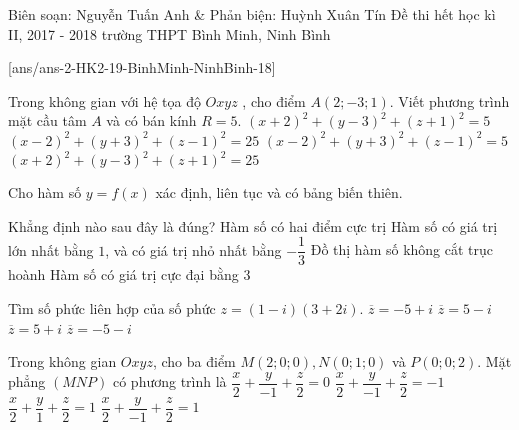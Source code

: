 
\begin{name}
{Biên soạn: Nguyễn Tuấn Anh \& Phản biện: Huỳnh Xuân Tín}
{Đề thi hết học kì II, 2017 - 2018 trường THPT Bình Minh, Ninh Bình}
\end{name}
\setcounter{ex}{0}\setcounter{bt}{0}
[ans/ans-2-HK2-19-BinhMinh-NinhBinh-18]
\begin{ex}%
Trong không gian với hệ tọa độ $Oxyz$ , cho điểm $A(2;-3;1)$. Viết phương trình mặt cầu tâm
$A$ và có bán kính $R=5$.
\choice
{$(x+2)^2+(y-3)^2+(z+1)^2=5$}
{\True $(x-2)^2+(y+3)^2+(z-1)^2=25$}
{$(x-2)^2+(y+3)^2+(z-1)^2=5$}
{$(x+2)^2+(y-3)^2+(z+1)^2=25$}
\end{ex}
\begin{ex}%
Cho hàm số $y=f(x)$ xác định, liên tục và có bảng biến thiên.
\begin{center}
\end{center}
Khẳng định nào sau đây là đúng?
\choice
{\True Hàm số có hai điểm cực trị}
{Hàm số có giá trị lớn nhất bằng $1$, và có giá trị nhỏ nhất bằng $-\dfrac{1}{3}$}
{Đồ thị hàm số không cắt trục hoành}
{Hàm số có giá trị cực đại bằng $3$}
\end{ex}
\begin{ex}%
Tìm số phức liên hợp của số phức $z=(1-i)(3+2i)$.
\choice
{$\overline{z}=-5+i$}
{$\overline{z}=5-i$}
{\True $\overline{z}=5+i$}
{$\overline{z}=-5-i$}
\end{ex}
\begin{ex}%
Trong không gian $Oxyz$, cho ba điểm $M(2;0;0), N(0;1;0)$ và $P(0;0;2)$. Mặt phẳng $(MNP)$ có phương trình là
\choice
{$\dfrac{x}{2}+\dfrac{y}{-1}+\dfrac{z}{2}=0$}
{$\dfrac{x}{2}+\dfrac{y}{-1}+\dfrac{z}{2}=-1$}
{\True $\dfrac{x}{2}+\dfrac{y}{1}+\dfrac{z}{2}=1$}
{$\dfrac{x}{2}+\dfrac{y}{-1}+\dfrac{z}{2}=1$}
\end{ex}
